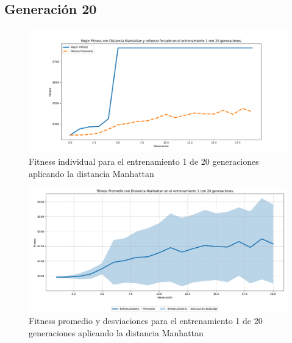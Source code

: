 \documentclass[conference]{IEEEtran}
\begin{document}
\subsection{Generación 20}
\setcounter{figure}{0}
\renewcommand{\thefigure}{S\arabic{figure}C-M}

\begin{figure}[H]
    \centering
    \includegraphics[width=0.9 \linewidth]{Manhattan/Fitness_individual_20Gen/Fitness_1_Manh_20Gen.png}
    \caption{Fitness individual para el entrenamiento 1 de 20 generaciones aplicando la distancia Manhattan}
    \label{fig:manhattan_1_20}
\end{figure}
\begin{figure}[H]
    \centering
    \includegraphics[width=0.9 \linewidth]{Manhattan/Fitness_individual_20Gen/Fitness_1_Manh_20Gen_Sombra.png}
    \caption{Fitness promedio y desviaciones para el entrenamiento 1 de 20 generaciones aplicando la distancia Manhattan}
    \label{fig:manhattan_1_20_sombra}
\end{figure}
\end{document}
